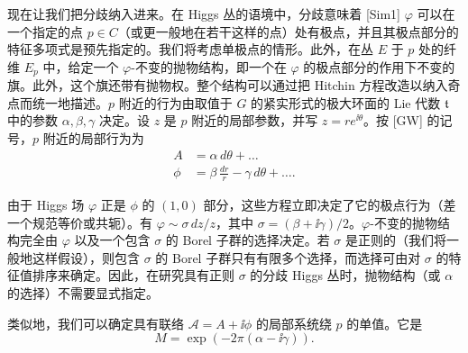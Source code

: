 现在让我们把分歧纳入进来。在 Higgs 丛的语境中，分歧意味着 [Sim1] $\varphi$ 可以在一个指定的点 $p\in C$（或更一般地在若干这样的点）处有极点，并且其极点部分的特征多项式是预先指定的。我们将考虑单极点的情形。此外，在丛 $E$ 于 $p$ 处的纤维 $E_p$ 中，给定一个 $\varphi$-不变的抛物结构，即一个在 $\varphi$ 的极点部分的作用下不变的旗。此外，这个旗还带有抛物权。整个结构可以通过把 Hitchin 方程改造以纳入奇点而统一地描述。$p$ 附近的行为由取值于 $G$ 的紧实形式的极大环面的 Lie 代数 $\mathfrak{t}$ 中的参数 $\alpha,\beta,\gamma$ 决定。设 $z$ 是 $p$ 附近的局部参数，并写 $z=re^{\ii\theta}$。按 [GW] 的记号，$p$ 附近的局部行为为
\begin{equation}\tag{3.4}
\begin{aligned}
A &= \alpha\, d\theta + \ldots\\
\phi &= \beta\,\frac{dr}{r} - \gamma\, d\theta + \ldots .
\end{aligned}
\end{equation}

由于 Higgs 场 $\varphi$ 正是 $\phi$ 的 $(1,0)$ 部分，这些方程立即决定了它的极点行为（差一个规范等价或共轭）。有 $\varphi\sim\sigma\, dz/z$，其中 $\sigma=(\beta+\ii\gamma)/2$。$\varphi$-不变的抛物结构完全由 $\varphi$ 以及一个包含 $\sigma$ 的 Borel 子群的选择决定。若 $\sigma$ 是正则的（我们将一般地这样假设），则包含 $\sigma$ 的 Borel 子群只有有限多个选择，而选择可由对 $\sigma$ 的特征值排序来确定。因此，在研究具有正则 $\sigma$ 的分歧 Higgs 丛时，抛物结构（或 $\alpha$ 的选择）不需要显式指定。

类似地，我们可以确定具有联络 $\mathcal{A}=A+\ii\phi$ 的局部系统绕 $p$ 的单值。它是
\begin{equation}\tag{3.5}
M=\exp(-2\pi(\alpha-\ii\gamma)).
\end{equation}

